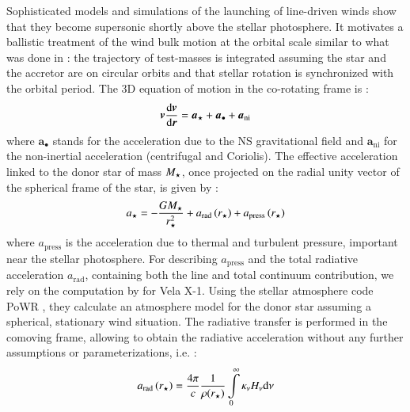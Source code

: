 \documentclass{aa}
\makeatletter
\newcommand*{\ns}{NS\@\xspace}
\newcommand*\diff{\mathop{}\!\mathrm{d}}
\newcommand{\mystar}{{\fontfamily{lmr}\selectfont$\star$}}
\makeatother
\begin{document}
Sophisticated models and simulations of the launching of line-driven winds show that they become supersonic shortly above the stellar photosphere. It motivates a ballistic treatment of the wind bulk motion at the orbital scale similar to what was done in \cite{ElMellah2016a} : the trajectory of test-masses is integrated assuming the star and the accretor are on circular orbits and that stellar rotation is synchronized with the orbital period. The 3D equation of motion in the co-rotating frame is :
\begin{equation}
\label{eq:ball}
\boldsymbol{v}\frac{\diff \boldsymbol{v}}{\diff \boldsymbol{r}} = \boldsymbol{a}_{\text{\mystar}} + \boldsymbol{a}_{\bullet} + \boldsymbol{a}_{\text{ni}}
\end{equation}
where $\boldsymbol{a}_{\bullet}$ stands for the acceleration due to the \ns gravitational field and $\boldsymbol{a}_{\text{ni}}$ for the non-inertial acceleration (centrifugal and Coriolis). The effective acceleration linked to the donor star of mass $M_{\text{\mystar}}$, once projected on the radial unity vector of the spherical frame of the star, is given by :
\begin{equation}
a_{\text{\mystar}}=-\frac{GM_{\text{\mystar}}}{r_{\text{\mystar}}^2}+a_{\text{rad}}\left(r_{\text{\mystar}}\right)+a_{\text{press}}\left(r_{\text{\mystar}}\right)
\end{equation}
where $a_{\text{press}}$ is the acceleration due to thermal and turbulent pressure, important near the stellar photosphere. For describing $a_{\text{press}}$ and the total radiative acceleration $a_{\text{rad}}$, containing both the line and total continuum contribution, we rely on the computation by \cite{Sander2017} for Vela X-1. Using the stellar atmosphere code PoWR \citep[e.g.]{Hamann1998,Grafener2002}, they calculate an atmosphere model for the donor star assuming a spherical, stationary wind situation. The radiative transfer is performed in the comoving frame, allowing to obtain the radiative acceleration without any further assumptions or parameterizations, i.e. :
\begin{equation}
\label{eq:araddef}
a_{\text{rad}}\left(r_{\text{\mystar}}\right)  = \frac{4\pi}{c} \frac{1}{\rho(r_{\text{\mystar}})}  \int\limits_{0}^{\infty} \kappa_\nu H_\nu \mathrm{d}\nu 
\end{equation}
\end{document}
